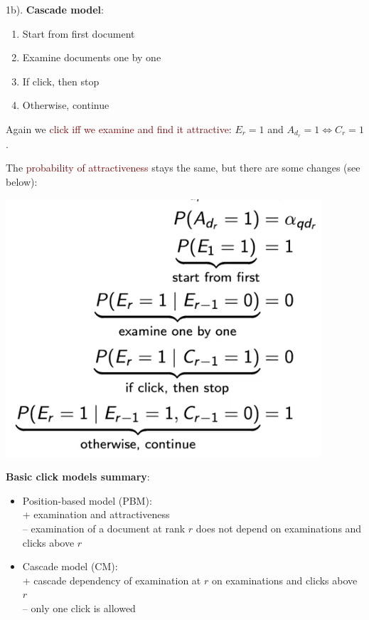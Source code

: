 \newpage
{\Large 1b). \textbf{Cascade model}: } 
\begin{enumerate}
    \setlength\itemsep{0em}
    \item Start from first document
    \item Examine documents one by one
    \item If click, then stop
    \item Otherwise, continue
\end{enumerate}

Again we \textcolor{Maroon}{click iff we examine and find it attractive}: $E_r = 1$ and $A_{d_{r}} = 1 \Leftrightarrow C_r = 1$.

The \textcolor{Maroon}{probability of attractiveness} stays the same, but there are some changes (see below): \\ 
\begin{minipage}{0.6\textwidth}
\includegraphics[scale=0.75]{figures/cascade.png}
\end{minipage}

\vspace{0.5cm}

{\Large \textbf{Basic click models summary}}: 
\begin{itemize}
    \setlength\itemsep{0em}
    \item Position-based model (PBM): \\
    + examination and attractiveness \\
    --  examination of a document at rank $r$ does not depend on examinations and clicks above $r$
    \item Cascade model (CM): \\
    + cascade dependency of examination at $r$ on examinations and clicks above $r$ \\
    -- only one click is allowed
\end{itemize}

